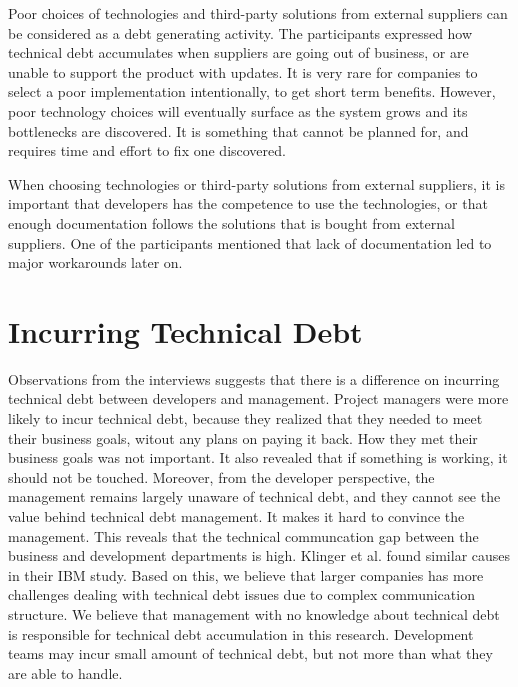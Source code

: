 Poor choices of technologies and third-party solutions from external suppliers can be considered as a debt generating activity. The participants expressed how technical debt accumulates when suppliers are going out of business, or are unable to support the product with updates. It is very rare for companies to select a poor implementation intentionally, to get short term benefits. However, poor technology choices will eventually surface as the system grows and its bottlenecks are discovered. It is something that cannot be planned for, and requires time and effort to fix one discovered. 

When choosing technologies or third-party solutions from external suppliers, it is important that developers has the competence to use the technologies, or that enough documentation follows the solutions that is bought from external suppliers. One of the participants mentioned that lack of documentation led to major workarounds later on.



\section{Incurring Technical Debt}
Observations from the interviews suggests that there is a difference on incurring technical debt between developers and management. Project managers were more likely to incur technical debt, because they realized that they needed to meet their business goals, witout any plans on paying it back. How they met their business goals was not important. It also revealed that if something is working, it should not be touched. Moreover, from the developer perspective, the management remains largely unaware of technical debt, and they cannot see the value behind technical debt management. It makes it hard to convince the management. This reveals that the technical communcation gap between the business and development departments is high. Klinger et al.\cite{p35-klinger} found similar causes in their IBM study. Based on this, we believe that larger companies has more challenges dealing with technical debt issues due to complex communication structure. We believe that management with no knowledge about technical debt is responsible for technical debt accumulation in this research.  Development teams may incur small amount of technical debt, but not more than what they are able to handle.

